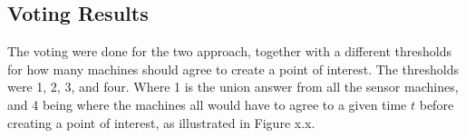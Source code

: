 \subsection{Voting Results}
The voting were done for the two approach, together with a different thresholds for how many machines should agree to create a point of interest.
The thresholds were 1, 2, 3, and four. Where 1 is the union answer from all the sensor machines, and 4 being where the machines all would have to agree to a given time $t$ before creating a point of interest, as illustrated in Figure x.x.









